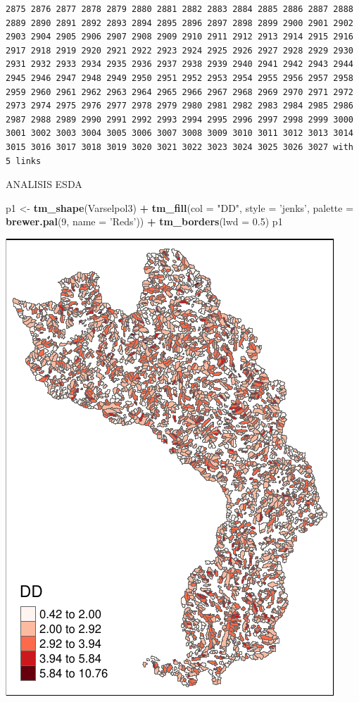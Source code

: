 \documentclass[11pt,]{article}
\newenvironment{Shaded}{\begin{snugshade}}{\end{snugshade}}
\newcommand{\KeywordTok}[1]{\textcolor[rgb]{0.13,0.29,0.53}{\textbf{#1}}}
\newcommand{\DataTypeTok}[1]{\textcolor[rgb]{0.13,0.29,0.53}{#1}}
\newcommand{\DecValTok}[1]{\textcolor[rgb]{0.00,0.00,0.81}{#1}}
\newcommand{\FloatTok}[1]{\textcolor[rgb]{0.00,0.00,0.81}{#1}}
\newcommand{\StringTok}[1]{\textcolor[rgb]{0.31,0.60,0.02}{#1}}
\newcommand{\OperatorTok}[1]{\textcolor[rgb]{0.81,0.36,0.00}{\textbf{#1}}}
\newcommand{\NormalTok}[1]{#1}
\begin{document}
\begin{verbatim}
2875 2876 2877 2878 2879 2880 2881 2882 2883 2884 2885 2886 2887 2888 2889 2890 2891 2892 2893 2894 2895 2896 2897 2898 2899 2900 2901 2902 2903 2904 2905 2906 2907 2908 2909 2910 2911 2912 2913 2914 2915 2916 2917 2918 2919 2920 2921 2922 2923 2924 2925 2926 2927 2928 2929 2930 2931 2932 2933 2934 2935 2936 2937 2938 2939 2940 2941 2942 2943 2944 2945 2946 2947 2948 2949 2950 2951 2952 2953 2954 2955 2956 2957 2958 2959 2960 2961 2962 2963 2964 2965 2966 2967 2968 2969 2970 2971 2972 2973 2974 2975 2976 2977 2978 2979 2980 2981 2982 2983 2984 2985 2986 2987 2988 2989 2990 2991 2992 2993 2994 2995 2996 2997 2998 2999 3000 3001 3002 3003 3004 3005 3006 3007 3008 3009 3010 3011 3012 3013 3014 3015 3016 3017 3018 3019 3020 3021 3022 3023 3024 3025 3026 3027 with 5 links
\end{verbatim}

ANALISIS ESDA

\begin{Shaded}
\begin{Highlighting}[]
\NormalTok{p1 <-}\StringTok{ }\KeywordTok{tm_shape}\NormalTok{(Varselpol3) }\OperatorTok{+}
\StringTok{  }\KeywordTok{tm_fill}\NormalTok{(}\DataTypeTok{col =} \StringTok{"DD"}\NormalTok{, }\DataTypeTok{style =} \StringTok{'jenks'}\NormalTok{, }\DataTypeTok{palette =} \KeywordTok{brewer.pal}\NormalTok{(}\DecValTok{9}\NormalTok{, }\DataTypeTok{name =} \StringTok{'Reds'}\NormalTok{)) }\OperatorTok{+}
\StringTok{  }\KeywordTok{tm_borders}\NormalTok{(}\DataTypeTok{lwd =} \FloatTok{0.5}\NormalTok{)}
\NormalTok{p1}
\end{Highlighting}
\end{Shaded}

\includegraphics{proyecto_f_files/figure-latex/unnamed-chunk-72-1.pdf}
\end{document}

